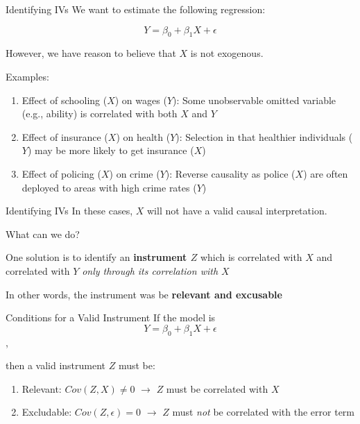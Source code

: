 \documentclass[
  ignorenonframetext,
]{beamer}
\providecommand{\tightlist}{%
  \setlength{\itemsep}{0pt}\setlength{\parskip}{0pt}}
\begin{document}
\begin{frame}{Identifying IVs}
\label{identifying-ivs}
We want to estimate the following regression:

\[ Y = \beta_{0} + \beta_{1}X + \epsilon \]

However, we have reason to believe that \(X\) is not exogenous.

Examples:

\begin{enumerate}
\tightlist
\item
  Effect of schooling (\(X\)) on wages (\(Y\)): Some unobservable
  omitted variable (e.g., ability) is correlated with both \(X\) and
  \(Y\)
\item
  Effect of insurance (\(X\)) on health (\(Y\)): Selection in that
  healthier individuals (\(Y\)) may be more likely to get insurance
  (\(X\))
\item
  Effect of policing (\(X\)) on crime (\(Y\)): Reverse causality as
  police (\(X\)) are often deployed to areas with high crime rates
  (\(Y\))
\end{enumerate}
\end{frame}

\begin{frame}{Identifying IVs}
\label{identifying-ivs-1}
In these cases, \(X\) will not have a valid causal interpretation.

What can we do?

One solution is to identify an \textbf{instrument \(Z\)} which is
correlated with \(X\) and correlated with \(Y\) \emph{only through its
correlation with \(X\)}

In other words, the instrument was be \textbf{relevant and excusable}
\end{frame}

\begin{frame}{Conditions for a Valid Instrument}
\label{conditions-for-a-valid-instrument}
If the model is \[Y = \beta_0 + \beta_1 X + \epsilon\],

then a valid instrument \(Z\) must be:

\begin{enumerate}
\tightlist
\item
  Relevant: \(Cov(Z,X) \neq 0\) \(\rightarrow\) \(Z\) must be correlated
  with \(X\)
\item
  Excludable: \(Cov(Z,\epsilon) = 0\) \(\rightarrow\) \(Z\) must
  \emph{not} be correlated with the error term
\end{enumerate}
\end{frame}
\end{document}
